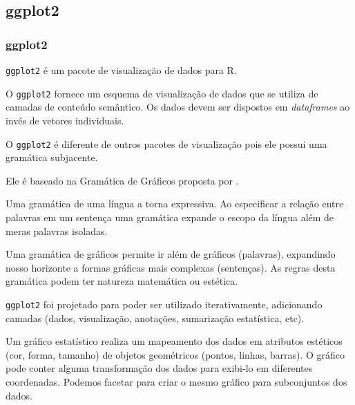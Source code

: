 \subsection{ggplot2}

\begin{frame}[allowframebreaks]
\frametitle{ggplot2}
\texttt{ggplot2} é um pacote de visualização de dados para R.

\vspace{3ex}
O \texttt{ggplot2} fornece um esquema de visualização de dados que se
utiliza de camadas de conteúdo semântico. Os dados devem ser dispostos em \emph{dataframes} 
ao invés de vetores individuais.

\framebreak 

O \texttt{ggplot2} é diferente de outros pacotes de visualização pois ele
possui uma gramática subjacente.

\vspace{3ex}
Ele é baseado na Gramática de Gráficos proposta por \textcite{wilkinson2005grammar}.

\vspace{3ex}
Uma gramática de uma língua a torna expressiva. Ao especificar a relação entre palavras em um sentença
uma gramática expande o escopo da língua além de meras palavras isoladas.

\vspace{3ex}
Uma gramática de gráficos permite ir além de gráficos (palavras), expandindo nosso horizonte a formas
gráficas mais complexas (sentenças). As regras desta gramática podem ter natureza matemática ou estética.


\vspace{3ex}
\texttt{ggplot2} foi projetado para poder ser utilizado iterativamente, adicionando camadas (dados, visualização, anotações, sumarização estatística, etc).

\vspace{3ex}
Um gráfico estatístico realiza um mapeamento dos dados em atributos estéticos (cor, forma, tamanho) de objetos geométricos (pontos, linhas, barras).
O gráfico pode conter alguma transformação dos dados para exibi-lo em diferentes coordenadas.
Podemos facetar para criar o mesmo gráfico para subconjuntos dos dados.
\end{frame}


